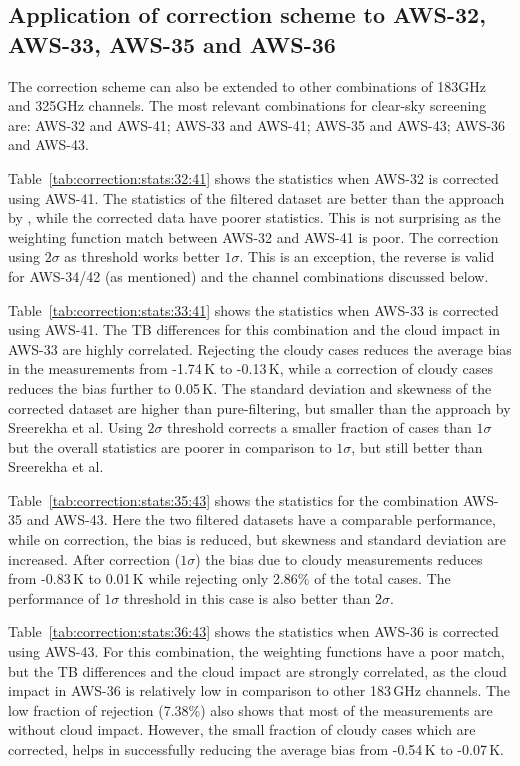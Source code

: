\documentclass[12pt]{article}
\begin{document}
\subsection{Application of correction scheme to AWS-32, AWS-33, AWS-35 and AWS-36}
%
The correction scheme can also be extended to other combinations of 183GHz and
325GHz channels. The most relevant combinations for clear-sky screening are: AWS-32 and
AWS-41; AWS-33 and AWS-41; AWS-35 and AWS-43; AWS-36 and AWS-43.

Table~\ref{tab:correction:stats:32:41} shows the statistics when AWS-32 is
corrected using AWS-41. The statistics of the filtered dataset are better than
the approach by \cite{rekha2012potential}, while the corrected data have poorer
statistics. This is not surprising as the weighting function match between
AWS-32 and AWS-41 is poor. The correction using $2\sigma$ as threshold works
better $1\sigma$. This is an exception, the reverse is valid for AWS-34/42 (as
mentioned) and the channel combinations discussed below.

Table~\ref{tab:correction:stats:33:41} shows the statistics when AWS-33 is
corrected using AWS-41. The TB differences for this combination and the cloud
impact in AWS-33 are highly correlated. Rejecting the cloudy cases reduces the
average bias in the measurements from -1.74\,K to -0.13\,K, while a correction
of cloudy cases reduces the bias further to 0.05\,K. The standard deviation and
skewness of the corrected dataset are higher than pure-filtering, but smaller
than the approach by Sreerekha et al. Using $2\sigma$ threshold corrects a
smaller fraction of cases than $1\sigma$ but the overall statistics are poorer
in comparison to $1\sigma$, but still better than Sreerekha et al.

Table~\ref{tab:correction:stats:35:43} shows the statistics for the combination AWS-35 and AWS-43. Here the two filtered datasets have a comparable performance, while on correction, the bias is reduced, but skewness and standard deviation are increased. After correction ($1\sigma$) the bias due to cloudy measurements reduces from -0.83\,K to 0.01\,K while rejecting only 2.86\% of the total cases.  The performance of $1\sigma$ threshold in this case is also better than $2\sigma$.  
 
 
Table~\ref{tab:correction:stats:36:43} shows the statistics when AWS-36 is
corrected using AWS-43. For this combination, the weighting functions have a
poor match, but the TB differences and the cloud impact are strongly
correlated, as the cloud impact in AWS-36 is relatively low in comparison to
other 183\,GHz channels. The low fraction of rejection (7.38\%) also shows that
most of the measurements are without cloud impact. However, the small fraction
of cloudy cases which are corrected, helps in successfully reducing the average
bias from -0.54\,K to -0.07\,K.
\end{document}
